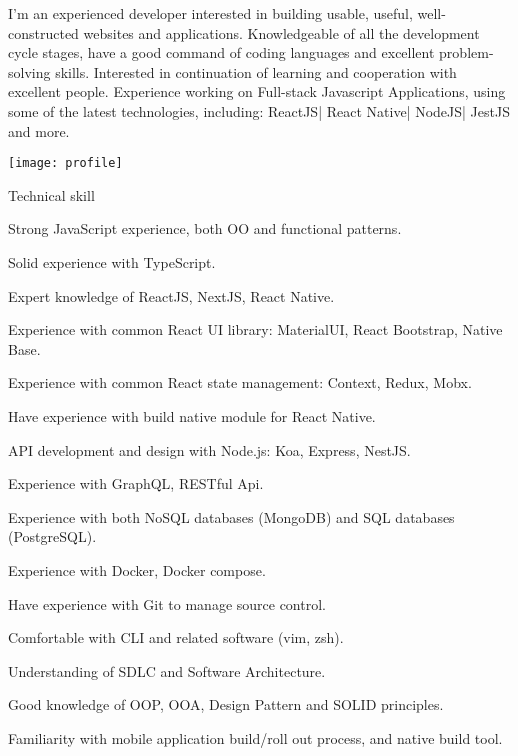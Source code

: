 \documentclass{resume}
\begin{document}

  \noindent\begin{minipage}{0.8\textwidth}%
    I'm an experienced developer interested in building usable, useful, well-constructed websites and applications. 
    Knowledgeable of all the development cycle stages, have a good command of coding languages and excellent problem-solving skills.
    Interested in continuation of learning and cooperation with excellent people.
    Experience working on Full-stack Javascript Applications, using some of the latest technologies, including:
    ReactJS| React Native| NodeJS| JestJS and more.
    \end{minipage}%
    \hfill%
    \begin{minipage}{0.1\textwidth}\raggedright
      \texttt{[image: profile]}
    \end{minipage}

  \begin{rSection}{Technical skill}
    \begin{rSubsection}{}{}{}{}
      \item Strong JavaScript experience, both OO and functional patterns.
      \item Solid experience with TypeScript.
      \item Expert knowledge of ReactJS, NextJS, React Native.
      \item Experience with common React UI library: MaterialUI, React Bootstrap, Native Base.
      \item Experience with common React state management: Context, Redux, Mobx.
      \item Have experience with build native module for React Native.

      \item API development and design with Node.js: Koa, Express, NestJS.
      \item Experience with GraphQL, RESTful Api.
      \item Experience with both NoSQL databases (MongoDB) and SQL databases (PostgreSQL).
      \item Experience with Docker, Docker compose.

      \item Have experience with Git to manage source control.
      \item Comfortable with CLI and related software (vim, zsh).
      \item Understanding of SDLC and Software Architecture.
      \item Good knowledge of OOP, OOA, Design Pattern and SOLID principles.
      \item Familiarity with mobile application build/roll out process, and native build tool.
    \end{rSubsection}
  \end{rSection}
  
\end{document}
